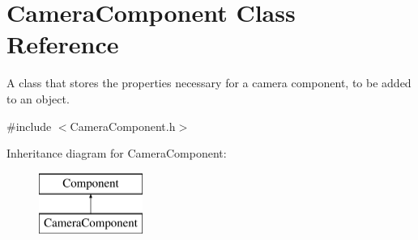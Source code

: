 \hypertarget{class_camera_component}{}\section{Camera\+Component Class Reference}
\label{class_camera_component}


A class that stores the properties necessary for a camera component, to be added to an object.  




{\ttfamily \#include $<$Camera\+Component.\+h$>$}

Inheritance diagram for Camera\+Component\+:\begin{figure}[H]
\begin{center}
\leavevmode
\includegraphics[height=2.000000cm]{class_camera_component}
\end{center}
\end{figure}
